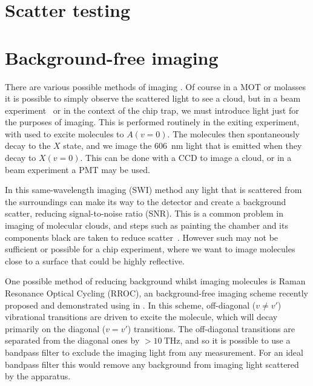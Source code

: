 \section{Scatter testing}
\label{exper:scatter}


\section{Background-free imaging}
\label{exper:bgf}


There are various possible methods of imaging \CaF{}. Of course in a MOT or
molasses it is possible to simply observe the scattered light to see a cloud,
but in a beam experiment~\cite{} or in the context of the chip trap, we must
introduce light just for the purposes of imaging. This is performed routinely
in the exiting experiment, with  used to excite molecules to
$A(v=0)$. The molecules then spontaneously decay to the $X$ state, and we image
the \SI{606}{\nano\meter} light that is emitted when they decay to $X(v=0)$.
This can be done with a CCD to image a cloud, or in a beam experiment a PMT
may be used. 

In this same-wavelength imaging (SWI) method any light that is scattered from
the surroundings can make its way to the detector and create a background
scatter, reducing signal-to-noise ratio (SNR). This is a common problem in
imaging of molecular clouds, and steps such as painting the chamber and its
components black are taken to reduce scatter~\cite{}. However such 
may not be sufficient or possible for a chip experiment, where we want to image
molecules close to a surface that could be highly reflective.

One possible method of reducing background whilst imaging molecules is Raman
Resonance Optical Cycling (RROC), an background-free imaging scheme recently
proposed and demonstrated using \SrF{} in . In this scheme,
off-diagonal ($v\neq v'$) vibrational transitions are driven to excite the
molecule, which will decay primarily on the diagonal ($v=v'$) transitions. The
off-diagonal transitions are separated from the diagonal ones by
$>\SI{10}{\tera\hertz}$, and so it is possible to use a bandpass filter to
exclude the imaging light from any measurement. For an ideal bandpass filter
this would remove any background from imaging light scattered by the apparatus.


